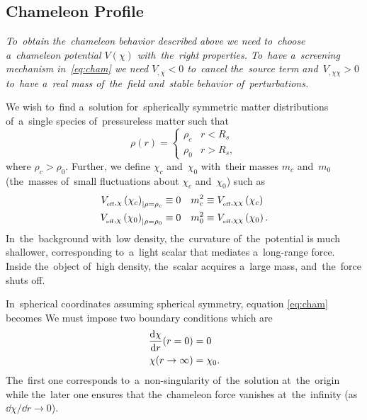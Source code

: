 \subsection{Chameleon Profile}
{\itshape
\label{cham_prof}
To~obtain the~chameleon behavior described above we need to~choose a~chameleon potential $V(\chi)$ with~the~right properties. To~have a~screening mechanism in~\eqref{eq:cham} we need $V_{,\chi}<0$ to~cancel the~source term and~$V_{,\chi\chi}>0$ to~have a~real mass of~the~field and~stable behavior of~perturbations.

We wish to~find a~solution for~spherically symmetric matter distributions of~a~single species of~pressureless matter such that
\begin{equation*}
\rho(r)=
\begin{cases}
\rho_c & r<R_s \\
\rho_0 & r>R_s,
\end{cases}
\end{equation*}
where $\rho_c>\rho_0$. Further, we define $\chi_c$ and~$\chi_0$ with~their masses $m_c$ and~$m_0$ (the~masses of~small fluctuations about $\chi_c$ and~$\chi_0$) such as
\begin{align*}
V_{_\text{\tiny eff},\chi}\left(\chi_c\right)_{|\rho=\rho_c}&\equiv0	&	m^2_c&\equiv V_{_\text{\tiny eff},\chi\chi}\left(\chi_c\right) \\
V_{_\text{\tiny eff},\chi}\left(\chi_0\right)_{|\rho=\rho_0}&\equiv0	&	m^2_0&\equiv V_{_\text{\tiny eff},\chi\chi}\left(\chi_0\right).
\end{align*}
In~the~background with~low density, the~curvature of~the~potential is much shallower, corresponding to~a~light scalar that mediates a~long-range force. Inside the~object of~high density, the~scalar acquires a~large mass, and~the~force shuts off.

In~spherical coordinates assuming spherical symmetry, equation \eqref{eq:cham} becomes
We must impose two boundary conditions which are
\begin{align*}
\frac{\mbox{d} \chi}{\mbox{d} r}(r=0)&=0 \\
\chi(r\rightarrow\infty)&=\chi_0.
\end{align*}
The~first one corresponds to~a~non-singularity of~the~solution at~the~origin while the~later one ensures that the~chameleon force vanishes at~the~infinity (as $\dd\chi/\dd r\rightarrow0$).

}
